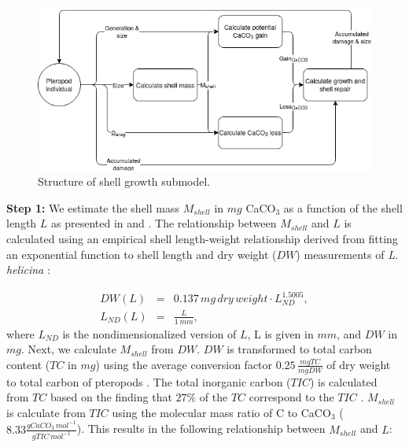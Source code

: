 \begin{figure}[tbh!]
    \centering
    
        \includegraphics[width=\textwidth]{images/Growth_submodel.png}
       
    
    \caption{Structure of shell growth submodel.}
    \label{fig:shell_growth}
\end{figure}


\textbf{Step 1:} We estimate the shell mass $M_{shell}$ in $mg$ CaCO$_3$ as a function of the shell length $L$ as presented in \citet{Bednarsek2012Population} and \citet{Bednarsek2014CalcificationDissolution}. The relationship between $M_{shell}$ and $L$ is calculated using an empirical shell length-weight relationship derived from fitting an exponential function to shell length and dry weight ($DW$) measurements of \textit{L. helicina} \citep{Bednarsek2012Population}:

{\scriptsize
\begin{eqnarray}
DW(L) & = & 0.137 \, mg \, dry \, weight \cdot L_{ND}^{1.5005}, \label{eq:dry_weight} \\ 
L_{ND}(L) & = & \frac{L}{1\, mm},
\end{eqnarray}}
\noindent
where $L_{ND}$ is the nondimensionalized version of $L$, L is given in $mm$, and $DW$ in $mg$. Next, we calculate $M_{shell}$ from $DW$. $DW$ is transformed to total carbon content ($TC$ in $mg$) using the average conversion factor $0.25\, \frac{mg TC}{mg DW}$ of dry weight to total carbon of pteropods \citep[][]{Davis1985DWandWW}. The total inorganic carbon ($TIC$) is calculated from $TC$ based on the finding that $27\%$ of the $TC$ correspond to the $TIC$ \citep{Bednarsek2012Population}. $M_{shell}$ is calculate from $TIC$ using the molecular mass ratio of C to CaCO$_3$ ($8.33 \frac{g CaCO_3 \,mol^{-1}}{g TIC\, mol^{-1}}$). This results in the following relationship between $M_{shell}$ and $L$:

